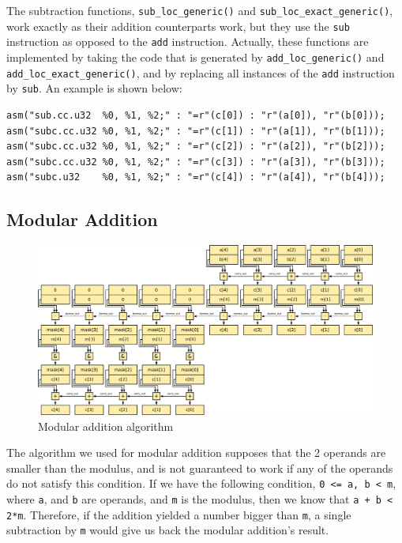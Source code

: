 \documentclass[10pt, a4paper]{report}
\begin{document}
The subtraction functions, \verb+sub_loc_generic()+ and
\verb+sub_loc_exact_generic()+, work exactly as their addition counterparts
work, but they use the \verb+sub+ instruction as opposed to the \verb+add+
instruction.
Actually, these functions are implemented by taking the code that is generated
by \verb+add_loc_generic()+ and \verb+add_loc_exact_generic()+, and by replacing
all instances of the \verb+add+ instruction by \verb+sub+.
An example is shown below:

\begin{lstlisting}
asm("sub.cc.u32  %0, %1, %2;" : "=r"(c[0]) : "r"(a[0]), "r"(b[0]));
asm("subc.cc.u32 %0, %1, %2;" : "=r"(c[1]) : "r"(a[1]), "r"(b[1]));
asm("subc.cc.u32 %0, %1, %2;" : "=r"(c[2]) : "r"(a[2]), "r"(b[2]));
asm("subc.cc.u32 %0, %1, %2;" : "=r"(c[3]) : "r"(a[3]), "r"(b[3]));
asm("subc.u32    %0, %1, %2;" : "=r"(c[4]) : "r"(a[4]), "r"(b[4]));
\end{lstlisting}

\subsection{Modular Addition}
\begin{figure}[h]
\centering
\includegraphics[width=\linewidth]{figs/modular_addition}
\caption{Modular addition algorithm}
\label{fig:modular_addition}
\end{figure}

The algorithm we used for modular addition supposes that the 2 operands are
smaller than the modulus, and is not guaranteed to work if any of the operands
do not satisfy this condition.
If we have the following condition, \verb+0 <= a, b < m+, where \verb+a+,
and \verb+b+ are operands, and \verb+m+ is the modulus, then we know that
\verb!a + b < 2*m!.
Therefore, if the addition yielded a number bigger than \verb+m+, a single
subtraction by \verb+m+ would give us back the modular addition's result.
\end{document}
